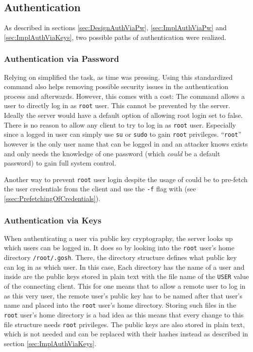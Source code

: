 \documentclass[10pt,a4paper,titlepage,twoside,english,final]{zhawreprt}
\begin{document}
\subsection{Authentication}\label{ssec:SecAuthentication}
As described in sections \ref{sec:DesignAuthViaPw}, \ref{sec:ImplAuthViaPw} and \ref{sec:ImplAuthViaKeys}, two possible paths of authentication were realized.

\subsubsection{Authentication via Password}\label{sssec:SecAuthViaPw}
Relying on \cite{login} simplified the task, as time was pressing.
Using this standardized command also helps removing possible security issues in the authentication process and afterwards.
However, this comes with a cost:
The \cite{login} command allows a user to directly log in as \texttt{root} user.
This cannot be prevented by the server.
Ideally the server would have a default option of allowing root login set to false.
There is no reason to allow any client to try to log in as \texttt{root} user.
Especially since a logged in user can simply use \texttt{su} or \texttt{sudo} to gain \texttt{root} privileges.
``\texttt{root}'' however is the only user name that can be logged in and an attacker knows exists and only needs the knowledge of one password (which \textit{could} be a default password) to gain full system control.

Another way to prevent \texttt{root} user login despite the usage of \cite{login} could be to pre-fetch the user credentials from the client and use the \texttt{-f} flag with \cite{login} (see \ref{ssec:PrefetchingOfCredentials}).

\subsubsection{Authentication via Keys}\label{sssec:SecAuthViaKeys}
When authenticating a user via public key cryptography, the server looks up which users can be logged in.
It does so by looking into the \texttt{root} user's home directory \texttt{/root/.gosh}.
There, the directory structure defines what public key can log in as which user.
In this case, Each directory has the name of a user and inside are the public keys stored in plain text with the file name of the \texttt{USER} value of the connecting client.
This for one means that to allow a remote user to log in as this very user, the remote user's public key has to be named after that user's name and placed into the \texttt{root} user's home directory.
Storing such files in the \texttt{root} user's home directory is a bad idea as this means that every change to this file structure needs \texttt{root} privileges.
The public keys are also stored in plain text, which is not needed and can be replaced with their hashes instead as described in section \ref{sec:ImplAuthViaKeys}.
\end{document}
